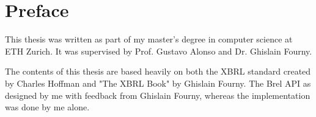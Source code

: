 \section{Preface}

This thesis was written as part of my master's degree in computer science at ETH Zurich.
It was supervised by Prof. Gustavo Alonso and Dr. Ghislain Fourny.


The contents of this thesis are based heavily on both the XBRL standard\cite{xbrl} created by Charles Hoffman and "The XBRL Book" \cite{fourny2023xbrl} by Ghislain Fourny.
The Brel API as designed by me with feedback from Ghislain Fourny,
whereas the implementation was done by me alone.
